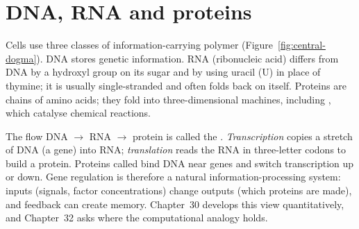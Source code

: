\section{DNA, RNA and proteins}
Cells use three classes of information-carrying polymer
(Figure~\ref{fig:central-dogma}). DNA stores genetic information. RNA
(ribonucleic acid) differs from DNA by a hydroxyl group on its sugar and by
using uracil (U) in place of thymine; it is usually single-stranded and often
folds back on itself. Proteins are chains of amino acids; they fold into
three-dimensional machines, including , which catalyse chemical
reactions.


The flow DNA $\to$ RNA $\to$ protein is called the .
\emph{Transcription} copies a stretch of DNA (a gene) into RNA; \emph{translation}
reads the RNA in three-letter codons to build a protein. Proteins called
 bind DNA near genes and switch transcription up or
down. Gene regulation is therefore a natural information-processing system:
inputs (signals, factor concentrations) change outputs (which proteins are
made), and feedback can create memory. Chapter~30 develops this view
quantitatively, and Chapter~32 asks where the computational analogy holds.

